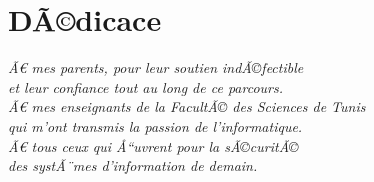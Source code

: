 \chapter*{DÃ©dicace}
\thispagestyle{empty}
\vspace*{4cm}
\begin{center}
\textit{Ã€ mes parents, pour leur soutien indÃ©fectible\\
et leur confiance tout au long de ce parcours.}\\[1cm]
\textit{Ã€ mes enseignants de la FacultÃ© des Sciences de Tunis\\
qui m'ont transmis la passion de l'informatique.}\\[1cm]
\textit{Ã€ tous ceux qui Å“uvrent pour la sÃ©curitÃ©\\
des systÃ¨mes d'information de demain.}
\end{center}
\cleardoublepage
